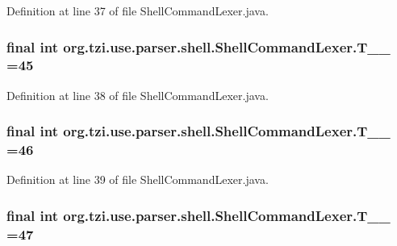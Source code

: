 Definition at line 37 of file Shell\-Command\-Lexer.\-java.

\hypertarget{classorg_1_1tzi_1_1use_1_1parser_1_1shell_1_1_shell_command_lexer_a64431cba9d122fb805bdadae74ad286a}{
\subsubsection[{T\-\_\-\-\_\-45}]{\setlength{\rightskip}{0pt plus 5cm}final int org.\-tzi.\-use.\-parser.\-shell.\-Shell\-Command\-Lexer.\-T\-\_\-\-\_ =45\hspace{0.3cm}{\ttfamily [static]}}}\label{classorg_1_1tzi_1_1use_1_1parser_1_1shell_1_1_shell_command_lexer_a64431cba9d122fb805bdadae74ad286a}


Definition at line 38 of file Shell\-Command\-Lexer.\-java.

\hypertarget{classorg_1_1tzi_1_1use_1_1parser_1_1shell_1_1_shell_command_lexer_aee8d18109f2c697127468c3251521190}{
\subsubsection[{T\-\_\-\-\_\-46}]{\setlength{\rightskip}{0pt plus 5cm}final int org.\-tzi.\-use.\-parser.\-shell.\-Shell\-Command\-Lexer.\-T\-\_\-\-\_ =46\hspace{0.3cm}{\ttfamily [static]}}}\label{classorg_1_1tzi_1_1use_1_1parser_1_1shell_1_1_shell_command_lexer_aee8d18109f2c697127468c3251521190}


Definition at line 39 of file Shell\-Command\-Lexer.\-java.

\hypertarget{classorg_1_1tzi_1_1use_1_1parser_1_1shell_1_1_shell_command_lexer_a23527b5fac7f19702cb89fcc41e17aff}{
\subsubsection[{T\-\_\-\-\_\-47}]{\setlength{\rightskip}{0pt plus 5cm}final int org.\-tzi.\-use.\-parser.\-shell.\-Shell\-Command\-Lexer.\-T\-\_\-\-\_ =47\hspace{0.3cm}{\ttfamily [static]}}}\label{classorg_1_1tzi_1_1use_1_1parser_1_1shell_1_1_shell_command_lexer_a23527b5fac7f19702cb89fcc41e17aff}


